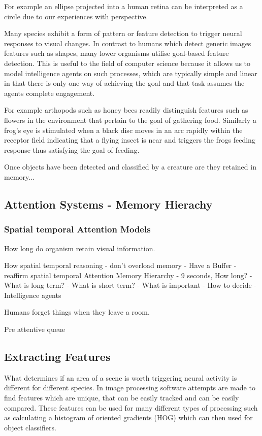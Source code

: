 \documentclass{mproj}
\begin{document}
For example an ellipse projected into a human retina can be interpreted as a circle due to our experiences with perspective. 

Many species exhibit a form of pattern or feature detection to trigger neural responses to visual changes. In contrast to humans which detect generic images features such as shapes, many lower organisms utilise goal-based feature detection. This is useful to the field of computer science because it allows us to model intelligence agents on such processes, which are typically simple and linear in that there is only one way of achieving the goal and that task assumes the agents complete engagement.

For example arthopods such as honey bees readily distinguish features such as flowers in the environment that pertain to the goal of gathering food. Similarly a frog's eye is stimulated when a black disc moves in an arc rapidly within the receptor field indicating that a flying insect is near and triggers the frogs feeding response \cite{} thus satisfying the goal of feeding.

Once objects have been detected and classified by a creature are they retained in memory...
 
\subsection{Attention Systems - Memory Hierachy}
\subsubsection{Spatial temporal Attention Models}

How long do organism retain visual information.

How spatial temporal reasoning
- don't overload memory
- Have a Buffer
- reaffirm spatial temporal Attention
Memory Hierarchy
- 9 seconds, How long?
- What is long term?
- What is short term? 
- What is important
- How to decide
- Intelligence agents

Humans forget things when they leave a room.

Pre attentive queue
 
\subsection{Extracting Features}

What determines if an area of a scene is worth triggering neural activity is different for different species. In image processing software attempts are made to find features which are unique, that can be easily tracked and can be easily compared. These features can be used for many different types of processing such as calculating a histogram of oriented gradients (HOG) which can then used for object classifiers.
\end{document}
